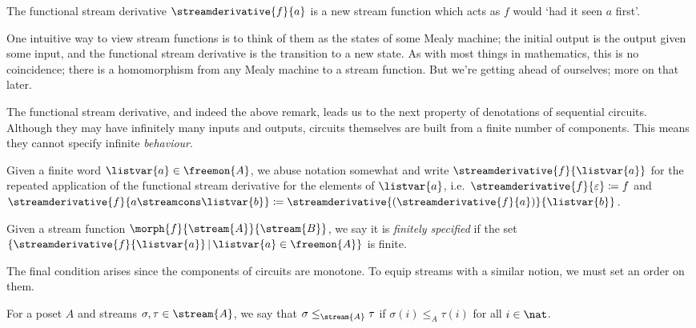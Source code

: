 The functional stream derivative \(\streamderivative{f}{a}\) is a new stream
function which acts as \(f\) would `had it seen \(a\) first'.

\begin{remark}
    One intuitive way to view stream functions is to think of them as the states
    of some Mealy machine; the initial output is the output given some input,
    and the functional stream derivative is the transition to a new state.
    As with most things in mathematics, this is no coincidence; there is a
    homomorphism from any Mealy machine to a stream function.
    But we're getting ahead of ourselves; more on that later.
\end{remark}

The functional stream derivative, and indeed the above remark, leads us to the
next property of denotations of sequential circuits.
Although they may have infinitely many inputs and outputs, circuits themselves
are built from a finite number of components.
This means they cannot specify infinite \emph{behaviour}.

\begin{notation}
    Given a finite word \(\listvar{a} \in \freemon{A}\), we abuse notation
    somewhat and write \(\streamderivative{f}{\listvar{a}}\) for the repeated
    application of the functional stream derivative for the elements of
    \(\listvar{a}\), i.e.\ \(
        \streamderivative{f}{\varepsilon} \coloneqq f
    \) and \(
        \streamderivative{f}{a \streamcons \listvar{b}} \coloneqq
        \streamderivative{(\streamderivative{f}{a})}{\listvar{b}}
    \).
\end{notation}

\begin{definition}
    Given a stream function \(\morph{f}{\stream{A}}{\stream{B}}\), we say it is
    \emph{finitely specified} if the set \(\{
        \streamderivative{f}{\listvar{a}} \,|\, \listvar{a} \in \freemon{A}
    \}\) is finite.
\end{definition}

The final condition arises since the components of circuits are monotone.
To equip streams with a similar notion, we must set an order on them.

\begin{notation}
    For a poset \(A\) and streams \(\sigma,\tau \in \stream{A}\), we say that
    \(\sigma \leq_{\stream{A}} \tau\) if \(\sigma(i) \leq_A \tau(i)\) for all
    \(i \in \nat\).
\end{notation}

